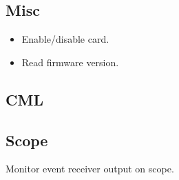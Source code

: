 \documentclass[a4paper,10pt]{article}
\begin{document}
	\subsection{Misc}
	\begin{itemize}
		\item Enable/disable card.
		\item Read firmware version.
	\end{itemize}

	\subsection{CML}

	\subsection{Scope}
	Monitor event receiver output on scope.
\end{document}
